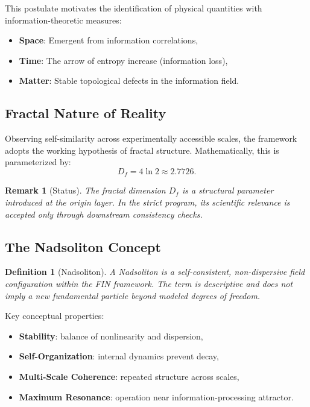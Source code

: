 \documentclass[11pt,a4paper]{article}
\newtheorem{definition}{Definition}
\newtheorem{remark}{Remark}
\begin{document}
This postulate motivates the identification of physical quantities with information-theoretic measures:
\begin{itemize}[leftmargin=1.4em]
    \item \textbf{Space}: Emergent from information correlations,
    \item \textbf{Time}: The arrow of entropy increase (information loss),
    \item \textbf{Matter}: Stable topological defects in the information field.
\end{itemize}

\subsection{Fractal Nature of Reality}
Observing self-similarity across experimentally accessible scales, the framework adopts the working hypothesis of fractal structure.
Mathematically, this is parameterized by:
\begin{equation}
D_f = 4 \ln 2 \approx 2.7726.
\end{equation}

\begin{remark}[Status]
The fractal dimension $D_f$ is a structural parameter introduced at the origin layer. In the strict program, its scientific relevance is accepted only through downstream consistency checks.
\end{remark}

\subsection{The Nadsoliton Concept}
\begin{definition}[Nadsoliton]
A Nadsoliton is a self-consistent, non-dispersive field configuration within the FIN framework. The term is descriptive and does not imply a new fundamental particle beyond modeled degrees of freedom.
\end{definition}

Key conceptual properties:
\begin{itemize}[leftmargin=1.4em]
    \item \textbf{Stability}: balance of nonlinearity and dispersion,
    \item \textbf{Self-Organization}: internal dynamics prevent decay,
    \item \textbf{Multi-Scale Coherence}: repeated structure across scales,
    \item \textbf{Maximum Resonance}: operation near information-processing attractor.
\end{itemize}
\end{document}
